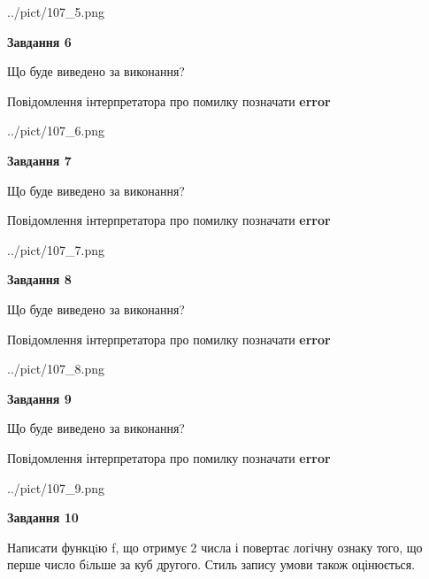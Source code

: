 \documentclass[12pt, ukrainian]{article}
\begin{document}
{\begin {large}
\begin{center}
	{../pict/107_5.png}
\end{center}
\newpage

{\begin {center}\textbf{Завдання 6}\end {center}}\par
Що буде виведено за виконання? \par
Повідомлення інтерпретатора про помилку позначати \textbf{error}

\begin{center}
	{../pict/107_6.png}
\end{center}
\newpage

{\begin {center}\textbf{Завдання 7}\end {center}}\par
Що буде виведено за виконання? \par
Повідомлення інтерпретатора про помилку позначати \textbf{error}

\begin{center}
	{../pict/107_7.png}
\end{center}
\newpage

{\begin {center}\textbf{Завдання 8}\end {center}}\par
Що буде виведено за виконання? \par
Повідомлення інтерпретатора про помилку позначати \textbf{error}

\begin{center}
	{../pict/107_8.png}
\end{center}
\newpage

{\begin {center}\textbf{Завдання 9}\end {center}}\par
Що буде виведено за виконання? \par
Повідомлення інтерпретатора про помилку позначати \textbf{error}

\begin{center}
	{../pict/107_9.png}
\end{center}
\newpage

{\begin {center}\textbf{Завдання 10}\end {center}}\par

Написати функцiю f, що отримує 2 числа і повертає логічну ознаку того, що перше число бiльше за куб другого. Стиль запису умови також оцінюється.\par
\newpage

\end {large}}
\end{document}
